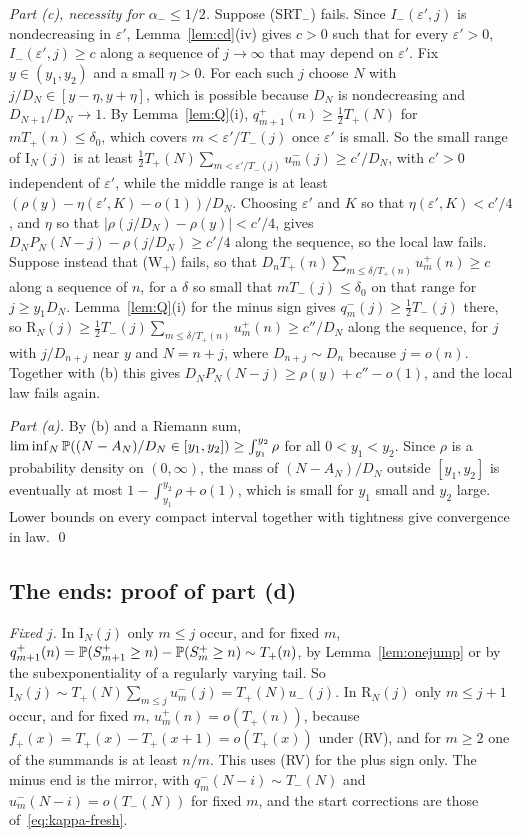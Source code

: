 \emph{Part (c), necessity for $\alpha_\minus\le1/2$.} Suppose (SRT$_\minus$) fails. Since
$I_\minus(\varepsilon',j)$ is nondecreasing in $\varepsilon'$, Lemma~\ref{lem:cd}(iv) gives $c>0$ such
that for every $\varepsilon'>0$, $I_\minus(\varepsilon',j)\ge c$ along a sequence of $j\to\infty$ that may
depend on $\varepsilon'$. Fix $y\in(y_1,y_2)$ and a small $\eta>0$. For each such $j$ choose $N$ with
$j/D_N\in[y-\eta,y+\eta]$, which is possible because $D_N$ is nondecreasing and
$D_{N+1}/D_N\to1$. By Lemma~\ref{lem:Q}(i), $q^\plus_{m+1}(n)\ge\frac12T_\plus(N)$ for
$mT_\plus(n)\le\delta_0$, which covers $m<\varepsilon'/T_\minus(j)$ once $\varepsilon'$ is small. So the
small range of $\mathrm I_N(j)$ is at least $\frac12T_\plus(N)\sum_{m<\varepsilon'/T_\minus(j)}u^\minus_m(j)\ge c'/D_N$,
with $c'>0$ independent of $\varepsilon'$, while the middle range is at least
$(\rho(y)-\eta(\varepsilon',K)-o(1))/D_N$. Choosing $\varepsilon'$ and $K$ so that
$\eta(\varepsilon',K)<c'/4$, and $\eta$ so that $|\rho(j/D_N)-\rho(y)|<c'/4$, gives
$D_NP_N(N-j)-\rho(j/D_N)\ge c'/4$ along the sequence, so the local law fails. Suppose instead
that (W$_\plus$) fails, so that $D_nT_\plus(n)\sum_{m\le\delta/T_\plus(n)}u^\plus_m(n)\ge c$ along a
sequence of $n$, for a $\delta$ so small that $mT_\minus(j)\le\delta_0$ on that range for
$j\ge y_1D_N$. Lemma~\ref{lem:Q}(i) for the minus sign gives $q^\minus_m(j)\ge\frac12T_\minus(j)$
there, so $\mathrm R_N(j)\ge\frac12T_\minus(j)\sum_{m\le\delta/T_\plus(n)}u^\plus_m(n)\ge c''/D_N$ along
the sequence, for $j$ with $j/D_{n+j}$ near $y$ and $N=n+j$, where $D_{n+j}\sim D_n$ because
$j=o(n)$. Together with (b) this gives $D_NP_N(N-j)\ge\rho(y)+c''-o(1)$, and the local law
fails again.

\emph{Part (a).} By (b) and a Riemann sum, $\liminf_N\mathbb{P}((N-A_N)/D_N\in[y_1,y_2])\ge\int_{y_1}^{y_2}\rho$
for all $0<y_1<y_2$. Since $\rho$ is a probability density on $(0,\infty)$, the mass of
$(N-A_N)/D_N$ outside $[y_1,y_2]$ is eventually at most $1-\int_{y_1}^{y_2}\rho+o(1)$, which is
small for $y_1$ small and $y_2$ large. Lower bounds on every compact interval together with
tightness give convergence in law. \qed

\subsection{The ends: proof of part (d)}\label{sec:dom-ends}

\emph{Fixed $j$.} In $\mathrm I_N(j)$ only $m\le j$ occur, and for fixed $m$,
$q^{+}_{m+1}(n)=\mathbb{P}(S^{+}_{m+1}\ge n)-\mathbb{P}(S^{+}_m\ge n)\sim T_{+}(n)$, by
Lemma~\ref{lem:onejump} or by the subexponentiality of a regularly varying tail. So
$\mathrm I_N(j)\sim T_\plus(N)\sum_{m\le j}u^\minus_m(j)=T_\plus(N)u_\minus(j)$. In $\mathrm R_N(j)$ only
$m\le j+1$ occur, and for fixed $m$, $u^\plus_m(n)=o(T_\plus(n))$, because
$f_\plus(x)=T_\plus(x)-T_\plus(x+1)=o(T_\plus(x))$ under (RV), and for $m\ge2$ one of the summands
is at least $n/m$. This uses (RV) for the plus sign only. The minus end is the mirror, with
$q^\minus_m(N-i)\sim T_\minus(N)$ and $u^\minus_m(N-i)=o(T_\minus(N))$ for fixed $m$, and the start
corrections are those of~\eqref{eq:kappa-fresh}.

